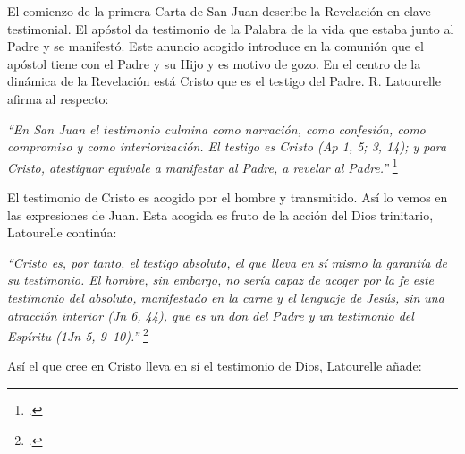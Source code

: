 \documentclass[../main.tex]{subfiles}
\begin{document}
El comienzo de la primera Carta de San Juan describe la Revelación en clave testimonial. El apóstol da testimonio de la Palabra de la vida que estaba junto al Padre y se manifestó. Este anuncio acogido introduce en la comunión que el apóstol tiene con el Padre y su Hijo y es motivo de gozo. En el centro de la dinámica de la Revelación está Cristo que es el testigo del Padre. R. Latourelle afirma al respecto:

\emph{
``En San Juan el testimonio culmina como narración, como confesión, como compromiso y como interiorización. El testigo es Cristo (Ap 1, 5; 3, 14); y para Cristo, atestiguar equivale a manifestar al Padre, a revelar al Padre.''
}\footcite[1529]{dicctf}

El testimonio de Cristo es acogido por el hombre y transmitido. Así lo vemos en las expresiones de Juan. Esta acogida es fruto de la acción del Dios trinitario, Latourelle continúa:

\emph{
``Cristo es, por tanto, el testigo absoluto, el que lleva en sí mismo la garantía de su testimonio. El hombre, sin embargo, no sería capaz de acoger por la fe este testimonio del absoluto, manifestado en la carne y el lenguaje de Jesús, sin una atracción interior (Jn 6, 44), que es un don del Padre y un testimonio del Espíritu (1Jn 5, 9--10).''
}\footcite[1530]{dicctf}

Así el que cree en Cristo lleva en sí el testimonio de Dios, Latourelle añade:
\end{document}
